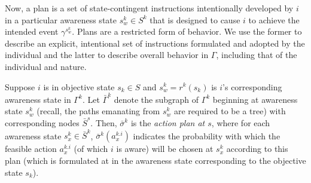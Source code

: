 \documentclass[
11pt,
titlepage,
reqno,
]{article}%
\theoremstyle{definition}
\begin{document}
Now, a  plan is a set of state-contingent instructions intentionally developed by $i$ in a particular awareness state $s^k_w\in S^k$ that is designed to cause $i$ to achieve the intended event $\gamma^{s^k_w}$.
Plans are a restricted form of behavior. 
We use the former to describe an explicit, intentional set of instructions formulated and adopted by the individual and the latter to describe overall behavior in $\Gamma$, including that of the individual and nature.

Suppose $i$ is in objective state $s_k\in S$ and $s^k_w=r^k(s_k)$ is $i$'s corresponding awareness state in $\Gamma^k$. 
Let $\bar{\Gamma}^{k}$ denote the subgraph of $\Gamma^k$ beginning at awareness state  $s^k_w$ (recall, the paths emanating from $s^k_w$ are required to be a tree) with corresponding nodes $\bar{S}^{s}$.
Then, $\bar{\sigma}^{k}$  is the \textit{action plan at $s$}, where for each awareness state $s^k_x\in \bar{S}^{k}$, $\bar{\sigma}^{k}(a^{k.i}_{x})$ indicates the probability with which the feasible action $a^{k.i}_{x}$ (of which $i$ is aware) will be chosen at $s^k_x$ according to this plan (which is formulated at in the awareness state corresponding to the objective state $s_k$).
\end{document}
